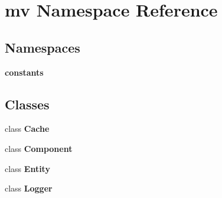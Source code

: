 \section{mv Namespace Reference}
\label{namespacemv}
\subsection*{Namespaces}
\begin{DoxyCompactItemize}
\item 
 \textbf{ constants}
\end{DoxyCompactItemize}
\subsection*{Classes}
\begin{DoxyCompactItemize}
\item 
class \textbf{ Cache}
\item 
class \textbf{ Component}
\item 
class \textbf{ Entity}
\item 
class \textbf{ Logger}
\end{DoxyCompactItemize}
